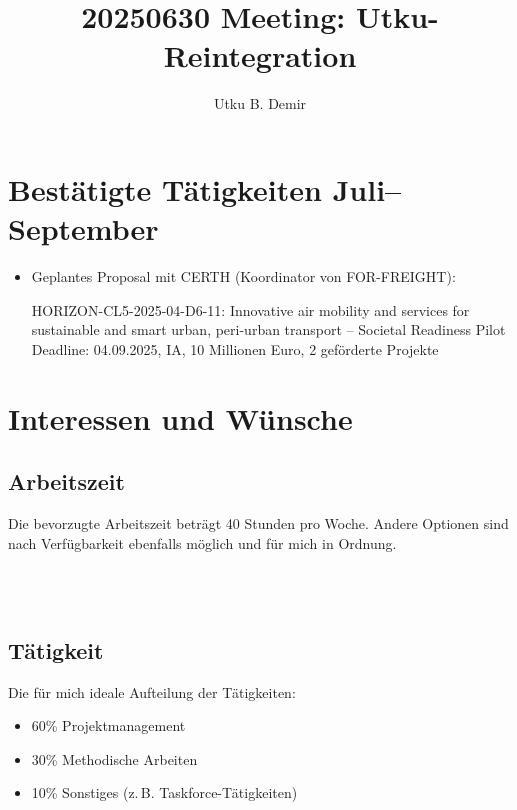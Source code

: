 
\title{20250630 Meeting: Utku-Reintegration}
\author{Utku B. Demir}


\maketitle

\section{Bestätigte Tätigkeiten Juli–September}

\begin{itemize}
	\item Geplantes Proposal mit CERTH (Koordinator von FOR-FREIGHT):

	      HORIZON-CL5-2025-04-D6-11: Innovative air mobility and services for sustainable and smart urban, peri-urban transport – Societal Readiness Pilot
	      Deadline: 04.09.2025, IA, 10 Millionen Euro, 2 geförderte Projekte
\end{itemize}


\section{Interessen und Wünsche}

\subsection{Arbeitszeit}
Die bevorzugte Arbeitszeit beträgt 40 Stunden pro Woche.
Andere Optionen sind nach Verfügbarkeit ebenfalls möglich und für mich in Ordnung.

\noindent
{}

\\
\\
\noindent
\subsection{Tätigkeit}
Die für mich ideale Aufteilung der Tätigkeiten:

\begin{itemize}
	\item 60\% Projektmanagement
	\item 30\% Methodische Arbeiten
	\item 10\% Sonstiges (z.\,B. Taskforce-Tätigkeiten)
\end{itemize}

